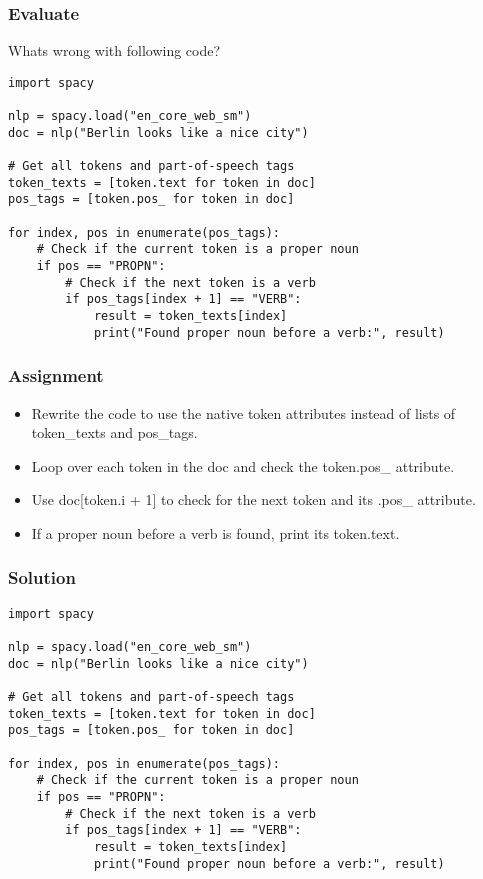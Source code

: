 \begin{frame}[fragile]\frametitle{Evaluate}

Whats wrong with following code?

  \begin{lstlisting}
import spacy

nlp = spacy.load("en_core_web_sm")
doc = nlp("Berlin looks like a nice city")

# Get all tokens and part-of-speech tags
token_texts = [token.text for token in doc]
pos_tags = [token.pos_ for token in doc]

for index, pos in enumerate(pos_tags):
    # Check if the current token is a proper noun
    if pos == "PROPN":
        # Check if the next token is a verb
        if pos_tags[index + 1] == "VERB":
            result = token_texts[index]
            print("Found proper noun before a verb:", result)
  \end{lstlisting}

\end{frame}

\begin{frame}[fragile]\frametitle{Assignment}


  \begin{itemize}
    \item Rewrite the code to use the native token attributes instead of lists of token\_texts and pos\_tags.
    \item Loop over each token in the doc and check the token.pos\_ attribute.
    \item Use doc[token.i + 1] to check for the next token and its .pos\_ attribute.
    \item If a proper noun before a verb is found, print its token.text.
  \end{itemize}

\end{frame}



\begin{frame}[fragile]\frametitle{Solution}

  \begin{lstlisting}
import spacy

nlp = spacy.load("en_core_web_sm")
doc = nlp("Berlin looks like a nice city")

# Get all tokens and part-of-speech tags
token_texts = [token.text for token in doc]
pos_tags = [token.pos_ for token in doc]

for index, pos in enumerate(pos_tags):
    # Check if the current token is a proper noun
    if pos == "PROPN":
        # Check if the next token is a verb
        if pos_tags[index + 1] == "VERB":
            result = token_texts[index]
            print("Found proper noun before a verb:", result)
  \end{lstlisting}

\end{frame}

